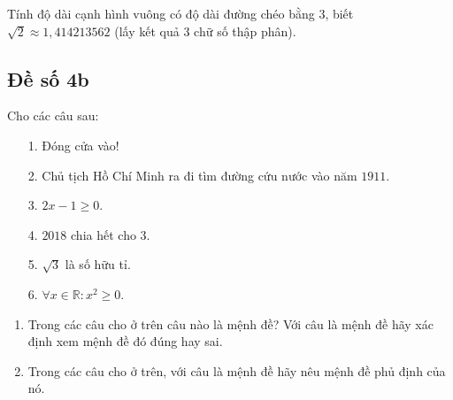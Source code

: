 \begin{bt}%
	Tính độ dài cạnh hình vuông có độ dài đường chéo bằng $3$, biết $ \sqrt{2} \approx 1,414213562 $ (lấy kết quả 3 chữ số thập phân).
\end{bt}

\subsection{Đề số 4b}
\setcounter{bt}{0}

\begin{bt}%
	Cho các câu sau:
	\begin{itemize}
		\item[1.] Đóng cửa vào!
		\item[2.] Chủ tịch Hồ Chí Minh ra đi tìm đường cứu nước vào năm $1911$.
		\item[3.] $2x-1\geq 0$.
		\item[4.] $2018$ chia hết cho $3$.
		\item[5.] $\sqrt{3}$ là số hữu tỉ.
		\item[6.] $\forall x\in \mathbb{R}:x^2\geq 0$.
	\end{itemize}
	\begin{enumerate}
		\item Trong các câu cho ở trên câu nào là mệnh đề? Với câu là mệnh đề hãy xác định xem mệnh đề đó đúng hay sai.
		\item Trong các câu cho ở trên, với câu là mệnh đề hãy nêu mệnh đề phủ định của nó.
	\end{enumerate}
\end{bt}
